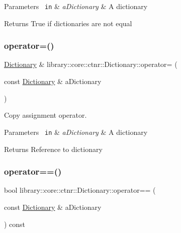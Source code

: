 \begin{DoxyParams}[1]{Parameters}
\mbox{\texttt{ in}}  & {\em a\+Dictionary} & A dictionary \\
\hline
\end{DoxyParams}
\begin{DoxyReturn}{Returns}
True if dictionaries are not equal 
\end{DoxyReturn}
\mbox{\label{classlibrary_1_1core_1_1ctnr_1_1_dictionary_a777e326af296dd48c1e3fcc51d378f58}} 
\subsubsection{\texorpdfstring{operator=()}{operator=()}}
{\footnotesize\ttfamily \mbox{\hyperlink{classlibrary_1_1core_1_1ctnr_1_1_dictionary}{Dictionary}} \& library\+::core\+::ctnr\+::\+Dictionary\+::operator= (\begin{DoxyParamCaption}\item[{const \mbox{\hyperlink{classlibrary_1_1core_1_1ctnr_1_1_dictionary}{Dictionary}} \&}]{a\+Dictionary }\end{DoxyParamCaption})}



Copy assignment operator. 


\begin{DoxyParams}[1]{Parameters}
\mbox{\texttt{ in}}  & {\em a\+Dictionary} & A dictionary \\
\hline
\end{DoxyParams}
\begin{DoxyReturn}{Returns}
Reference to dictionary 
\end{DoxyReturn}
\mbox{\label{classlibrary_1_1core_1_1ctnr_1_1_dictionary_ab4d5377a537b57f061a2a56e9bd86b47}} 
\subsubsection{\texorpdfstring{operator==()}{operator==()}}
{\footnotesize\ttfamily bool library\+::core\+::ctnr\+::\+Dictionary\+::operator== (\begin{DoxyParamCaption}\item[{const \mbox{\hyperlink{classlibrary_1_1core_1_1ctnr_1_1_dictionary}{Dictionary}} \&}]{a\+Dictionary }\end{DoxyParamCaption}) const}



